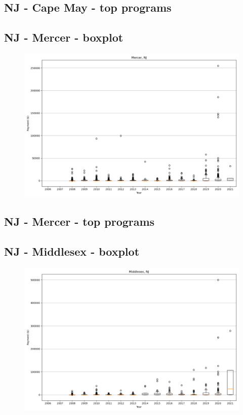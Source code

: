 \subsection*{NJ - Cape May - top programs}

\newpage
\subsection*{NJ - Mercer - boxplot}
\begin{figure}[h]
\centering
\includegraphics[width=7in]{../output/boxplots/counties/Mercer-NJ_boxplot.png}
\end{figure}


\subsection*{NJ - Mercer - top programs}

\newpage
\subsection*{NJ - Middlesex - boxplot}
\begin{figure}[h]
\centering
\includegraphics[width=7in]{../output/boxplots/counties/Middlesex-NJ_boxplot.png}
\end{figure}


